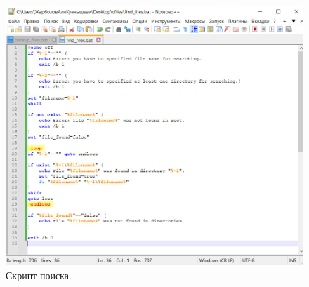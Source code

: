 \begin{figure}[h!]
    \centering
    \includegraphics[width=0.9\linewidth]{Pic/lab1/photo_2025-05-21_08-15-52.jpg}
    \caption{Скрипт поиска.}
    \label{fig:FindScript}
\end{figure}

